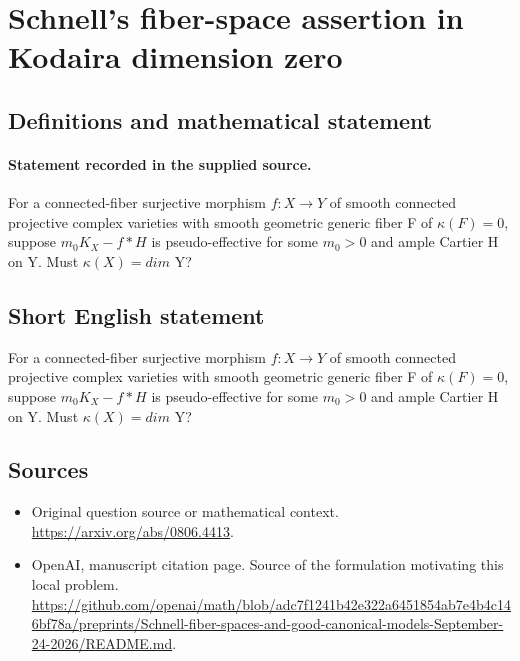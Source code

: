 \documentclass[11pt]{article}
\begin{document}
\section*{Schnell’s fiber-space assertion in Kodaira dimension zero}\label{statement}
\subsection{Definitions and mathematical statement}
\paragraph{Statement recorded in the supplied source.}
For a connected-fiber surjective morphism $f:X\to Y$ of smooth connected projective complex varieties with smooth geometric generic fiber F of $\kappa (F)=0$, suppose $m_{0}K_X-f*H$ is pseudo-effective for some $m_{0}>0$ and ample Cartier H on Y. Must $\kappa (X)=dim$ Y?
\subsection{Short English statement}
For a connected-fiber surjective morphism $f:X\to Y$ of smooth connected projective complex varieties with smooth geometric generic fiber F of $\kappa (F)=0$, suppose $m_{0}K_X-f*H$ is pseudo-effective for some $m_{0}>0$ and ample Cartier H on Y. Must $\kappa (X)=dim$ Y?
\subsection{Sources}
\begin{itemize}
\item[S1] Original question source or mathematical context.
\url{https://arxiv.org/abs/0806.4413}.
\item[S2] OpenAI, manuscript citation page. Source of the formulation motivating this local problem.
\url{https://github.com/openai/math/blob/adc7f1241b42e322a6451854ab7e4b4c146bf78a/preprints/Schnell-fiber-spaces-and-good-canonical-models-September-24-2026/README.md}.
\end{itemize}
\end{document}
